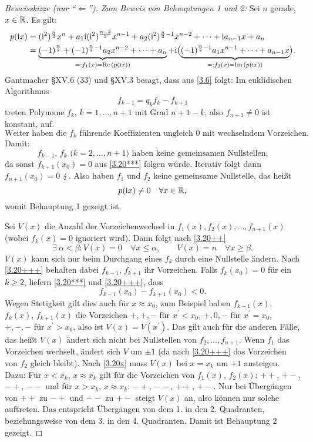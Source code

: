 \documentclass[a4paper,twoside,DIV15,BCOR12mm]{scrbook}
\begin{document}
\begin{proof}[Beweisskizze (nur "`$\Leftarrow$"')]
\textit{Zum Beweis von Behauptungen 1 und 2:} Sei $n$ gerade, $x\in\mathbb{R}$. Es gilt:
\begin{align*}
p(\mathrm{i} x) &= (\mathrm{i}^2)^{\frac{n}{2}}x^n + a_1\mathrm{i}(\mathrm{i}^2)^{\frac{n-2}{2}}x^{n-1} + a_2(\mathrm{i}^2)^{\frac{n}{2}-1}x^{n-2} + \dotsb +\mathrm{i} a_{n-1}x + a_n\\
&=\underbrace{(-1)^{\frac{n}{2}}+(-1)^{\frac{n}{2}-1}a_2x^{n-2}+\dotsb+a_n}_{=: f_1(x) = \operatorname{Re}{(p(\mathrm{i} x))}} + \mathrm{i}\bigl(\underbrace{(-1)^{\frac{n}{2}-1}a_1x^{n-1}+\dotsb+a_{n-1}x}_{=: f_2(x) = \operatorname{Im}{(p(\mathrm{i} x))}}\bigr).
\end{align*}
Gantmacher §XV.6 (33) und §XV.3 besagt, dass aus \eqref{3.6} folgt: Im euklidischen Algorithmus
\[\label{3.20***}f_{k-1} = q_kf_k-f_{k+1}\tag{$***$}\]
treten Polynome $f_k$, $k=1,\dotsc,n+1$ mit Grad $n+1-k$, also $f_{n+1}\neq 0$ ist konstant, auf. 
\[\label{3.20++}\text{Weiter haben die $f_k$ führende Koeffizienten ungleich 0 mit wechselndem Vorzeichen.}\tag{++}\]
Damit: 
\[\label{3.20+++}\text{$f_{k-1}$, $f_k$ ($k=2,\dotsc,n+1$) haben keine gemeinsamen Nullstellen,}\tag{+++}\]
da sonst $f_{k+1}(x_0) = 0$ aus \eqref{3.20***} folgen würde. Iterativ folgt dann $f_{n+1}(x_0) = 0$ $\lightning$. Also haben $f_1$ und $f_2$ keine gemeinsame Nullstelle, das heißt
\[p(\mathrm{i} x)\neq 0\quad\forall x\in\mathbb{R},\]
womit Behauptung 1 gezeigt ist.

Sei $V(x)$ die Anzahl der Vorzeichenwechsel in $f_1(x),f_2(x),\dotsc,f_{n+1}(x)$ (wobei $f_k(x)=0$ ignoriert wird). Dann folgt nach \eqref{3.20++}
\[\label{3.20x}\exists\:\alpha<\beta: V(x) = 0\quad\forall x\leq\alpha,\qquad V(x)=n\quad\forall x\geq\beta.\tag{$\times$}\]
$V(x)$ kann sich nur beim Durchgang eines $f_k$ durch eine Nullstelle ändern. Nach \eqref{3.20+++} behalten dabei $f_{k-1}$, $f_{k+1}$ ihr Vorzeichen. Falls $f_k(x_0) = 0$ für ein $k\geq 2$, liefern \eqref{3.20***} und \eqref{3.20+++}, dass
\[f_{k-1}(x_0) - f_{k+1}(x_0) < 0.\]
Wegen Stetigkeit gilt dies auch für $x\approx x_0$, zum Beispiel haben $f_{k-1}(x)$, $f_k(x)$, $f_{k+1}(x)$ die Vorzeichen $+,+,-$ für $x^\prime<x_0$, $+,0,-$ für $x^\prime=x_0$, $+,-,-$ für $x^\prime>x_0$, also ist $V(x) = V(x^\prime)$. Das gilt auch für die anderen Fälle, das heißt $V(x)$ ändert sich nicht bei Nullstellen von $f_2,\dotsc,f_{n+1}$. Wenn $f_1$ das Vorzeichen wechselt, ändert sich $V$ um $\pm 1$ (da nach \eqref{3.20+++} das Vorzeichen von $f_2$ gleich bleibt). Nach \eqref{3.20x} muss $V(x)$ bei $x=x_k$ um $+1$ ansteigen. Dazu:  Für $x<x_k$, $x\approx x_k$ gilt für die Vorzeichen von $f_1(x)$, $f_2(x)$: $++$, $+-$, $-+$, $--$ und für $x>x_k$, $x\approx x_k$: $-+$, $--$, $++$, $+-$. Nur bei Übergängen von $++$ zu $-+$ und $--$ zu $+-$ steigt $V(x)$ an, also können nur solche auftreten. Das entspricht Übergängen von dem 1. in den 2. Quadranten, beziehungsweise von dem 3. in den 4. Quadranten. Damit ist Behauptung 2 gezeigt.
\end{proof}
\end{document}
